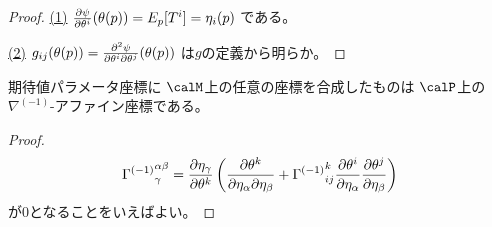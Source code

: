\documentclass[report]{jlreq}
\begin{document}

\begin{proof}
    \uline{(1)} \quad
    $\deldel[\psi]{\theta^i}(\theta(p)) = E_p[T^i] = \eta_i(p)$
    である。
    \TODO{}

    \uline{(2)} \quad
    $g_{ij}(\theta(p)) = \frac{\partial^2 \psi}{\partial \theta^i \partial \theta^j}(\theta(p))$
    は$g$の定義から明らか。
    \TODO{}
\end{proof}

\begin{theorem}
    期待値パラメータ座標に
    $\calM$上の任意の座標を合成したものは
    $\calP$上の$\nabla^{(-1)}$-アファイン座標である。
\end{theorem}

\begin{proof}
    \begin{equation}
        {\Gamma^{(-1)}}_{\gamma}^{\alpha\beta}
            =
                \deldel[\eta_\gamma]{\theta^k}
                \myparen{
                    \frac{\del \theta^k}{\del \eta_\alpha \del \eta_\beta}
                    +
                    {\Gamma^{(-1)}}_{ij}^k
                    \deldel[\theta^i]{\eta_\alpha}
                    \deldel[\theta^j]{\eta_\beta}
                }
    \end{equation}
    が$0$となることをいえばよい。
\end{proof}

\begin{example}
    \TODO{}
\end{example}

%
%
%
\end{document}

